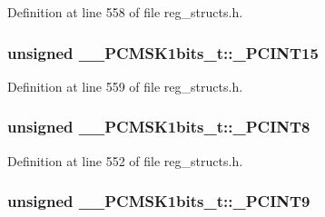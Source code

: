 Definition at line 558 of file reg\+\_\+structs.\+h.

\hypertarget{union_____p_c_m_s_k1bits__t_a2edb9a4c576fa0aee6cd7e0ba6351fef}{
\subsubsection[{\+\_\+\+P\+C\+I\+N\+T15}]{\setlength{\rightskip}{0pt plus 5cm}unsigned \+\_\+\+\_\+\+P\+C\+M\+S\+K1bits\+\_\+t\+::\+\_\+\+P\+C\+I\+N\+T15}}\label{union_____p_c_m_s_k1bits__t_a2edb9a4c576fa0aee6cd7e0ba6351fef}


Definition at line 559 of file reg\+\_\+structs.\+h.

\hypertarget{union_____p_c_m_s_k1bits__t_a04d644ab120173fc1d3809ee81f2bdcc}{
\subsubsection[{\+\_\+\+P\+C\+I\+N\+T8}]{\setlength{\rightskip}{0pt plus 5cm}unsigned \+\_\+\+\_\+\+P\+C\+M\+S\+K1bits\+\_\+t\+::\+\_\+\+P\+C\+I\+N\+T8}}\label{union_____p_c_m_s_k1bits__t_a04d644ab120173fc1d3809ee81f2bdcc}


Definition at line 552 of file reg\+\_\+structs.\+h.

\hypertarget{union_____p_c_m_s_k1bits__t_aa6503f2b6bd360c27cb07c0e629e867e}{
\subsubsection[{\+\_\+\+P\+C\+I\+N\+T9}]{\setlength{\rightskip}{0pt plus 5cm}unsigned \+\_\+\+\_\+\+P\+C\+M\+S\+K1bits\+\_\+t\+::\+\_\+\+P\+C\+I\+N\+T9}}\label{union_____p_c_m_s_k1bits__t_aa6503f2b6bd360c27cb07c0e629e867e}


